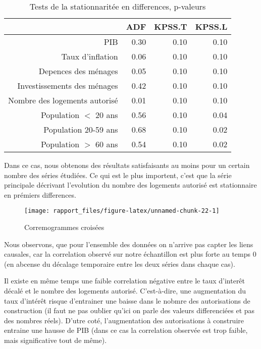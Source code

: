 \documentclass[11pt,]{article}
\begin{document}
\begin{table}[ht]
\centering
\begin{tabular}{rrrr}
  \hline
 & ADF & KPSS.T & KPSS.L \\ 
  \hline
PIB & 0.30 & 0.10 & 0.10 \\ 
  Taux d'inflation & 0.06 & 0.10 & 0.10 \\ 
  Depences des ménages & 0.05 & 0.10 & 0.10 \\ 
  Investissements des ménages & 0.42 & 0.10 & 0.10 \\ 
  Nombre des logements autorisé & 0.01 & 0.10 & 0.10 \\ 
  Population $<$ 20 ans & 0.56 & 0.10 & 0.04 \\ 
  Population 20-59 ans & 0.68 & 0.10 & 0.02 \\ 
  Population $>$ 60 ans & 0.54 & 0.10 & 0.02 \\ 
   \hline
\end{tabular}
\caption{Tests de la stationnaritée en differences, p-valeurs} 
\end{table}

\FloatBarrier

Dans ce cas, nous obtenons des résultats satisfaisants au moins pour un
certain nombre des séries étudiées. Ce qui est le plus importent, c'est
que la série principale décrivant l'evolution du nombre des logements
autorisé est stationnaire en prémiers differences.

\FloatBarrier

\begin{figure}[!htbp]

{\centering \texttt{[image: rapport\_files/figure-latex/unnamed-chunk-22-1]} 

}

\caption{Corremogrammes croisées}\label{fig:unnamed-chunk-22}
\end{figure}

\FloatBarrier

Nous observons, que pour l'ensemble des données on n'arrive pas capter
les liens causales, car la correlation observé sur notre échantillon est
plus forte au temps 0 (en abcense du décalage temporaire entre les deux
séries dans chaque cas).

Il existe en même temps une faible correlation négative entre le taux
d'interêt décalé et le nombre des logements autorisé. C'est-à-dire, une
augmentation du taux d'intérêt risque d'entrainer une baisse dans le
nobmre des autorisations de construction (il faut ne pas oublier qu'ici
on parle des valeurs differenciées et pas des nombres réels). D'utre
coté, l'augmentation des autorisations à construire entraine une hausse
de PIB (dans ce cas la correlation observée est trop faible, mais
significative tout de même).
\end{document}
